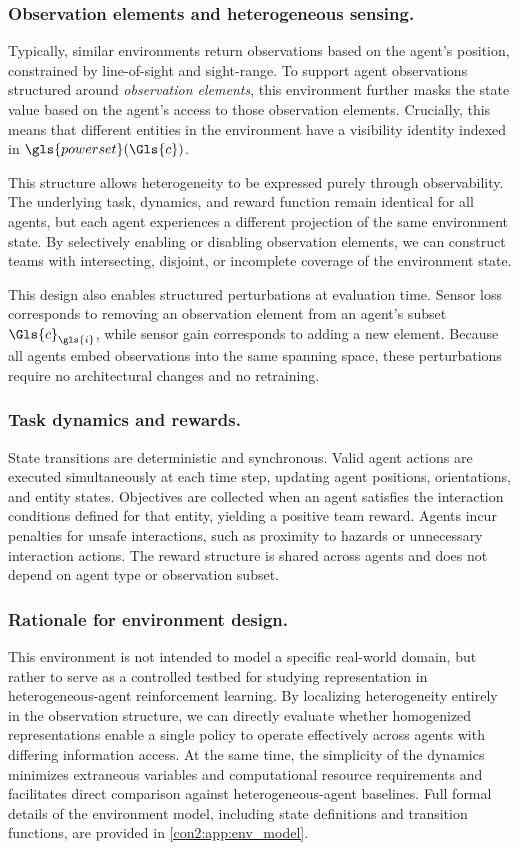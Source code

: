 \subsubsection{Observation elements and heterogeneous sensing.}
Typically, similar environments return observations based on 
the agent's position, constrained by line-of-sight and sight-range.
To support agent observations structured around \emph{observation elements},
this environment further masks the state value based on the agent's access 
to those observation elements.
Crucially, this means that different entities in the environment 
have a visibility identity indexed in \(\gls{powerset}(\Gls{c})\).%

This structure allows heterogeneity to be expressed purely through
observability.
The underlying task, dynamics, and reward function remain identical
for all agents, but each agent experiences a different projection of
the same environment state.
By selectively enabling or disabling observation elements, we can
construct teams with intersecting, disjoint, or incomplete coverage of
the environment state.

This design also enables structured perturbations at evaluation time.
Sensor loss corresponds to removing an observation element from an agent's subset 
\(\Gls{c}_{\gls{i}}\), while sensor gain corresponds to adding a new element.
Because all agents embed observations into the same spanning space,
these perturbations require no architectural changes and no retraining.

\subsubsection{Task dynamics and rewards.}
State transitions are deterministic and synchronous.
Valid agent actions are executed simultaneously at each time step,
updating agent positions, orientations, and entity states.
Objectives are collected when an agent satisfies the interaction
conditions defined for that entity, yielding a positive team reward.
Agents incur penalties for unsafe interactions, such as proximity to
hazards or unnecessary interaction actions.
The reward structure is shared across agents and does not depend on
agent type or observation subset.

\subsubsection{Rationale for environment design.}
This environment is not intended to model a specific real-world domain,
but rather to serve as a controlled testbed for studying representation
in heterogeneous-agent reinforcement learning.
By localizing heterogeneity entirely in the observation structure,
we can directly evaluate whether homogenized representations enable a
single policy to operate effectively across agents with differing
information access. At the same time, the simplicity of the dynamics 
minimizes extraneous variables and computational resource requirements and
facilitates direct comparison against heterogeneous-agent baselines.
Full formal details of the environment model, including state
definitions and transition functions, are provided in
\cref{con2:app:env_model}.

